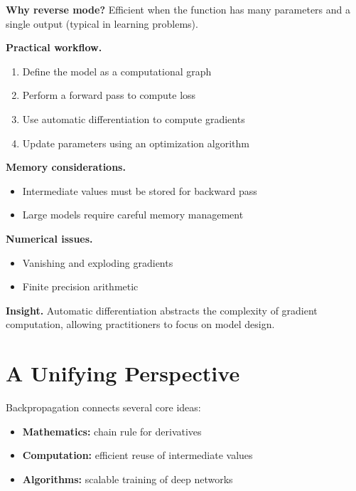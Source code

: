 \noindent
\textbf{Why reverse mode?}  
Efficient when the function has many parameters and a single output (typical in learning problems).

\medskip

\noindent
\textbf{Practical workflow.}
\begin{enumerate}
    \item Define the model as a computational graph
    \item Perform a forward pass to compute loss
    \item Use automatic differentiation to compute gradients
    \item Update parameters using an optimization algorithm
\end{enumerate}

\medskip

\noindent
\textbf{Memory considerations.}
\begin{itemize}
    \item Intermediate values must be stored for backward pass
    \item Large models require careful memory management
\end{itemize}

\medskip

\noindent
\textbf{Numerical issues.}
\begin{itemize}
    \item Vanishing and exploding gradients
    \item Finite precision arithmetic
\end{itemize}

\medskip

\noindent
\textbf{Insight.}  
Automatic differentiation abstracts the complexity of gradient computation, allowing practitioners to focus on model design.

\section{A Unifying Perspective}

Backpropagation connects several core ideas:

\begin{itemize}
    \item \textbf{Mathematics:} chain rule for derivatives
    \item \textbf{Computation:} efficient reuse of intermediate values
    \item \textbf{Algorithms:} scalable training of deep networks
\end{itemize}

